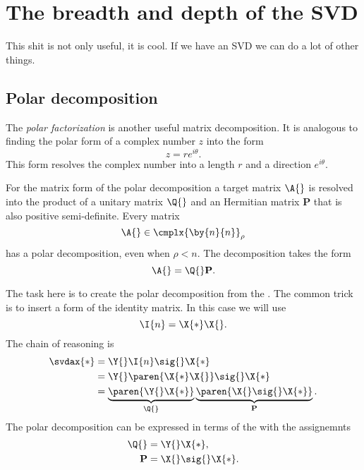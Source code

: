 \section{The breadth and depth of the SVD}
This shit is not only useful, it is cool. If we have an SVD we can do a lot of other things.

\subsection{Polar decomposition}
The \textit{polar factorization} is another useful matrix decomposition. It is analogous to finding the polar form of a complex number $z$ into the form
\begin{equation}
  z = r e^{i \theta}.
\end{equation}
This form resolves the complex number into a length $r$ and a direction $e^{i \theta}$. 

For the matrix form of the polar decomposition a target matrix $\A{}$ is resolved into the product of a unitary matrix $\Q{}$ and an Hermitian matrix $\mathbf{P}$ that is also positive semi-definite. Every matrix
$$
\A{}\in\cmplx{\by{n}{n}}_{\rho}
$$
has a polar decomposition, even when $\rho<n$.
The decomposition takes the form
\begin{equation}
  \A{} = \Q{}\mathbf{P}.
\end{equation}

The task here is to create the polar decomposition from the \svdl. The common trick is to insert a form of the identity matrix. In this case we will use
\begin{equation}
  \I{n} = \X{*}\X{}.
\end{equation}
The chain of reasoning is 
\begin{equation}
  \begin{split}
    \svdax{*} &= \Y{}\I{n}\sig{}\X{*} \\
      &= \Y{}\paren{\X{*}\X{}}\sig{}\X{*} \\
      &= \underbrace{\paren{\Y{}\X{*}}}_{\Q{}}\underbrace{\paren{\X{}\sig{}\X{*}}}_{\mathbf{P}}.
  \end{split}
\end{equation}
The polar decomposition can be expressed in terms of the \svdl with the assignemnts
\begin{equation}
  \begin{split}
    \Q{} &= \Y{}\X{*},\\
    \mathbf{P} &= \X{}\sig{}\X{*}.
  \end{split}
\end{equation}

